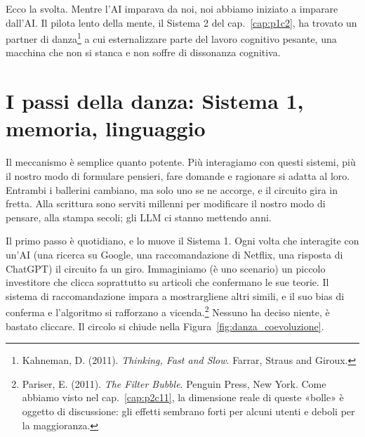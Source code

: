 Ecco la svolta. Mentre l'AI imparava da noi, noi abbiamo iniziato a imparare dall'AI. Il pilota lento della mente, il Sistema 2 del cap.~\ref{cap:p1c2}, ha trovato un partner di danza\footnote{Kahneman, D. (2011). \textit{Thinking, Fast and Slow}. Farrar, Straus and Giroux.} a cui esternalizzare parte del lavoro cognitivo pesante, una macchina che non si stanca e non soffre di dissonanza cognitiva.

\section{I passi della danza: Sistema 1, memoria, linguaggio}

Il meccanismo è semplice quanto potente. Più interagiamo con questi sistemi, più il nostro modo di formulare pensieri, fare domande e ragionare si adatta al loro. Entrambi i ballerini cambiano, ma solo uno se ne accorge, e il circuito gira in fretta. Alla scrittura sono serviti millenni per modificare il nostro modo di pensare, alla stampa secoli; gli LLM ci stanno mettendo anni.

Il primo passo è quotidiano, e lo muove il Sistema 1. Ogni volta che interagite con un'AI (una ricerca su Google, una raccomandazione di Netflix, una risposta di ChatGPT) il circuito fa un giro. Immaginiamo (è uno scenario) un piccolo investitore che clicca soprattutto su articoli che confermano le sue teorie. Il sistema di raccomandazione impara a mostrargliene altri simili, e il suo bias di conferma e l'algoritmo si rafforzano a vicenda.\footnote{Pariser, E. (2011). \textit{The Filter Bubble}. Penguin Press, New York. Come abbiamo visto nel cap.~\ref{cap:p2c11}, la dimensione reale di queste «bolle» è oggetto di discussione: gli effetti sembrano forti per alcuni utenti e deboli per la maggioranza.} Nessuno ha deciso niente, è bastato cliccare. Il circolo si chiude nella Figura~\ref{fig:danza_coevoluzione}.


